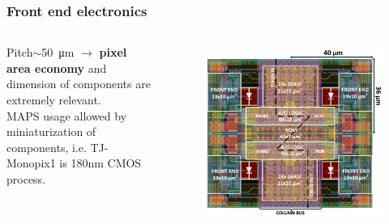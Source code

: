     \begin{frame}[noframenumbering]
        \frametitle{Front end electronics}
            \begin{columns}
                Pitch$\sim$\SI{50}{\um} $\rightarrow$ \textbf{pixel area economy} and dimension of components are extremely relevant. \\\smallskip
                MAPS usage allowed by miniaturization of components, i.e. TJ-Monopix1 is 180{nm} CMOS process.\\
                    \begin{figure}[h!]
                        \vspace*{-0.9cm}\hspace*{-0.9cm}
                        \includegraphics[width=1.06\linewidth]{figures/Monopix1/Monopix1_2x2pixelsgroup.png}
                    \end{figure}
            \end{columns}


\end{frame}
